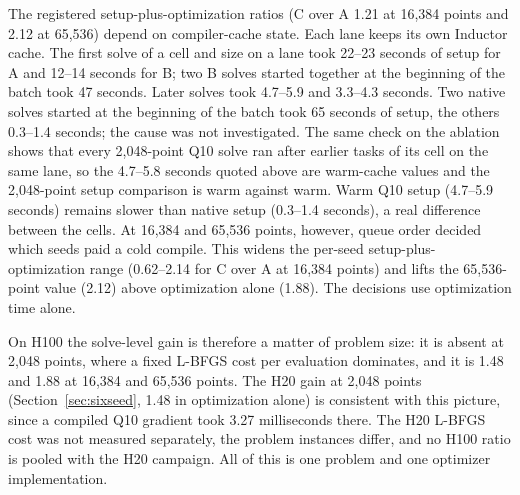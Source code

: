 \documentclass[11pt]{article}
\begin{document}
The registered setup-plus-optimization ratios (C over A 1.21 at 16,384
points and 2.12 at 65,536) depend on compiler-cache state. Each lane keeps
its own Inductor cache. The first solve of a cell and size on a lane took
22--23 seconds of setup for A and 12--14 seconds for B; two B solves
started together at the beginning of the batch took 47 seconds. Later
solves took 4.7--5.9 and 3.3--4.3 seconds. Two native solves started at the
beginning of the batch took 65 seconds of setup, the others 0.3--1.4
seconds; the cause was not investigated. The same check on the ablation
shows that every 2,048-point Q10 solve ran after earlier tasks of its cell
on the same lane, so the 4.7--5.8 seconds quoted above are warm-cache
values and the 2,048-point setup comparison is warm against warm. Warm Q10
setup (4.7--5.9 seconds) remains slower than native setup (0.3--1.4
seconds), a real difference between the cells. At 16,384 and 65,536 points,
however, queue order decided which seeds paid a cold compile. This widens
the per-seed setup-plus-optimization range (0.62--2.14 for C over A at
16,384 points) and lifts the 65,536-point value (2.12) above optimization
alone (1.88). The decisions use optimization time alone.

On H100 the solve-level gain is therefore a matter of problem size: it is
absent at 2,048 points, where a fixed L-BFGS cost per evaluation dominates,
and it is 1.48 and 1.88 at 16,384 and 65,536 points. The H20 gain at 2,048
points (Section~\ref{sec:sixseed}, 1.48 in optimization alone) is
consistent with this picture, since a compiled Q10 gradient took 3.27
milliseconds there. The H20 L-BFGS cost was not measured separately, the
problem instances differ, and no H100 ratio is pooled with the H20
campaign. All of this is one problem and one optimizer implementation.
\end{document}
